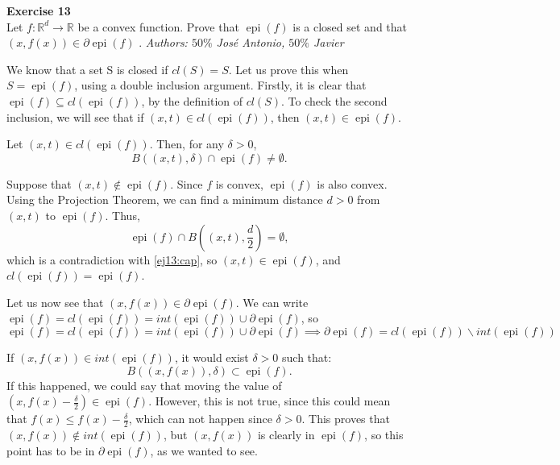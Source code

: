 \documentclass[11pt,table]{article}
\newenvironment{problem}[2][Exercise]
{ \begin{mdframed}[backgroundcolor=gray!20] \textbf{#1 #2} \\}
	{\hspace{0.0cm}\newline\newline \emph{Authors: \(50\%\) José Antonio, \(50\%\) Javier}  \end{mdframed}}
\begin{document}
\begin{problem}{13}
Let \( f : \mathbb{R}^d \to \mathbb{R} \) be a convex function. Prove that \( \operatorname{epi}(f) \) is a closed set and that \( (x, f(x)) \in \partial \operatorname{epi}(f) \)  .
\end{problem}

We know that a set S is closed if \(cl(S) = S\). Let us prove this when \(S = \operatorname{epi}(f)\), using a double inclusion argument. Firstly, it is clear that $\operatorname{epi}(f) \subseteq cl(\operatorname{epi}(f))$, by the definition of \(cl(S)\). To check the second inclusion, we will see that if \((x,t)\in cl(\operatorname{epi}(f))\), then \((x,t) \in \operatorname{epi}(f)\).

Let \((x,t)\in cl(\operatorname{epi}(f))\). Then, for any \(\delta > 0\),
\begin{equation}\label{ej13:cap}
	B((x,t),\delta) \cap 	\operatorname{epi}(f) \neq \emptyset.
\end{equation}

Suppose that \((x,t)\notin \operatorname{epi}(f)\). Since \(f\) is convex, \(\operatorname{epi}(f)\) is also convex. Using the Projection Theorem, we can find a minimum distance \(d > 0\) from \((x,t)\) to \(\operatorname{epi}(f)\). Thus,
\[
	\operatorname{epi}(f) \cap B((x,t), \frac{d}{2}) = \emptyset,
\]
which is a contradiction with \eqref{ej13:cap}, so \((x,t) \in \operatorname{epi}(f)\), and \(cl(\operatorname{epi}(f)) = \operatorname{epi}(f)\).

Let us now see that \((x,f(x)) \in \partial \operatorname{epi}(f)\). We can write \(\operatorname{epi}(f) = cl(\operatorname{epi}(f)) = int(\operatorname{epi}(f)) \cup \partial \operatorname{epi}(f)\), so
\[
	\operatorname{epi}(f) = cl(\operatorname{epi}(f)) = int(\operatorname{epi}(f)) \cup \partial \operatorname{epi}(f)	\implies \partial \operatorname{epi}(f) = cl(\operatorname{epi}(f)) \backslash int(\operatorname{epi}(f))
\]

If \((x,f(x)) \in int(\operatorname{epi}(f))\), it would exist \(\delta > 0\) such that:
\[
	B((x,f(x)),\delta) \subset \operatorname{epi}(f).
\]
If this happened, we could say that moving the value of  \((x,f(x)- \frac{\delta}{2}) \in \operatorname{epi}(f) \). However, this is not true, since this could mean that \(f(x) \leq f(x) - \frac{\delta}{2}\), which can not happen since \(\delta > 0\). This proves that \((x,f(x))\notin int(\operatorname{epi}(f))\), but \((x,f(x))\) is clearly in \(\operatorname{epi}(f)\), so this point has to be in \(\partial \operatorname{epi}(f)\), as we wanted to see.
\end{document}

